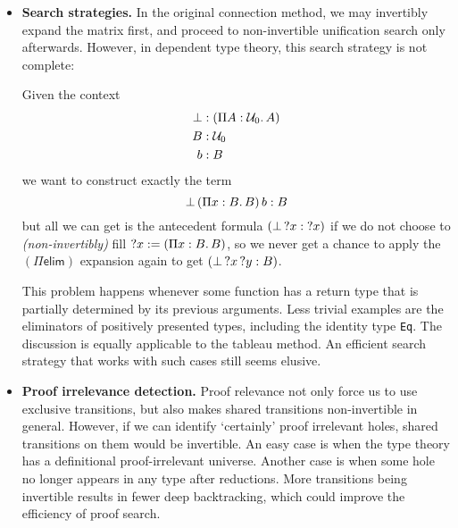\documentclass[twoside]{report}
\begin{document}
\begin{itemize}
    \item \textbf{Search strategies.} In the original connection method, we may invertibly expand the matrix first, and proceed to non-invertible unification search only afterwards. However, in dependent type theory, this search strategy is not complete:
    \begin{example}
    Given the context
    $$
    \begin{aligned}
    \bot &: (\Pi{A} : {\mathcal U_0}.\,{A}) \\
    B &: \mathcal U_0 \\
    b &: B \\
    \end{aligned}
    $$
    we want to construct exactly the term
    $$
    {{\bot}\,{(}\Pi{x} : {B}.\,{B})}\,{b} : B
    $$
    but all we can get is the antecedent formula $({\bot}\,{?x} : {?x})$ if we do not choose to \emph{(non-invertibly)} fill ${?x} := (\Pi{x} : {B}.\,{B})$, so we never get a chance to apply the $(\Pi\mathsf{elim})$ expansion again to get $({{\bot}\,{?x}}\,{?y} : B)$.
    \end{example}
    This problem happens whenever some function has a return type that is partially determined by its previous arguments. Less trivial examples are the eliminators of positively presented types, including the identity type \texttt{Eq}. The discussion is equally applicable to the tableau method. An efficient search strategy that works with such cases still seems elusive.

    \item \textbf{Proof irrelevance detection.} Proof relevance not only force us to use exclusive transitions, but also makes shared transitions non-invertible in general. However, if we can identify `certainly' proof irrelevant holes, shared transitions on them would be invertible. An easy case is when the type theory has a definitional proof-irrelevant universe. Another case is when some hole no longer appears in any type after reductions. More transitions being invertible results in fewer deep backtracking, which could improve the efficiency of proof search.
\end{itemize}
\end{document}
